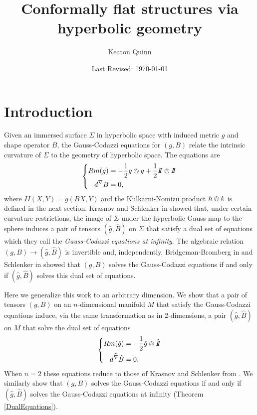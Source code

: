 \documentclass{amsart}
\newcommand{\two}{I\!\!I}
\begin{document}
\title{Conformally flat structures via hyperbolic geometry}
\author{Keaton Quinn}
\date{Last Revised: \today}

\begin{abstract}
\end{abstract}

\maketitle

\section{Introduction}

Given an immersed surface $\Sigma$ in hyperbolic space with induced metric $g$ and shape operator $B$, the Gauss-Codazzi equations for $(g,B)$ relate the intrinsic curvature of $\Sigma$ to the geometry of hyperbolic space.
The equations are
\[
\left\{
\begin{aligned}
Rm(g) &= -\frac{1}{2}g \owedge g + \frac{1}{2}\two \owedge \two \\
d^\nabla B &= 0,
\end{aligned}
\right.
\]
where $\two(X,Y) = g(BX,Y)$ and the Kulkarni-Nomizu product $h \owedge k$ is defined in the next section.
Krasnov and Schlenker in \cite{Krasnov-Schlenker2008} showed that, under certain curvature restrictions, the image of $\Sigma$ under the hyperbolic Gauss map to the sphere induces a pair of tensors $(\hat{g},\hat{B})$ on $\Sigma$ that satisfy a dual set of equations which they call the \emph{Gauss-Codazzi equations at infinity}. 
The algebraic relation $(g,B) \to (\hat{g},\hat{B})$ is invertible and, independently, Bridgeman-Bromberg in \cite{Bridgeman-Bromberg2022} and Schlenker in \cite{Schlenker2017} showed that $(g,B)$ solves the Gauss-Codazzi equations if and only if $(\hat{g},\hat{B})$ solves this dual set of equations. 

Here we generalize this work to an arbitrary dimension.
We show that a pair of tensors $(g,B)$ on an $n$-dimensional manifold $M$ that satisfy the Gauss-Codazzi equations induce, via the same transformation as in 2-dimensions, a pair $(\hat{g},\hat{B})$ on $M$ that solve the dual set of equations
\[
\left\{
\begin{aligned}
Rm(\hat{g}) &= -\frac{1}{2}\hat{g} \owedge \hat{\two} \\
d^{\widehat{\nabla}}\hat{B} &= 0.
\end{aligned}
\right.
\]
When $n=2$ these equations reduce to those of Krasnov and Schlenker from \cite{Krasnov-Schlenker2008}. 
We similarly show that $(g,B)$ solves the Gauss-Codazzi equations if and only if $(\hat{g},\hat{B})$ solves the Gauss-Codazzi equations at infinity (Theorem \ref{DualEquations}).
\end{document}
